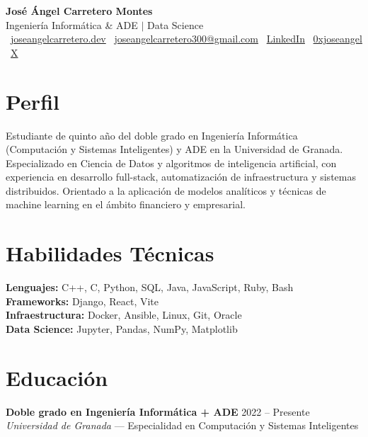 \documentclass[12pt,a4paper]{article}
\begin{document}
\begin{center}
  {\LARGE\bfseries José Ángel Carretero Montes}\\[6pt]
  {\normalsize Ingeniería Informática \& ADE $\mid$ Data Science}\\[8pt]
  \footnotesize
  \faGlobe\ \href{https://joseangelcarretero.dev}{joseangelcarretero.dev} \hspace{6pt}
  \faEnvelope\ \href{mailto:joseangelcarretero300@gmail.com}{joseangelcarretero300@gmail.com} \hspace{6pt}
  \faLinkedin\ \href{https://www.linkedin.com/in/jos\%C3\%A9-\%C3\%A1ngel-carretero-montes-476008202/}{LinkedIn} \hspace{6pt}
  \faGithub\ \href{https://github.com/0xjoseangel}{0xjoseangel} \hspace{6pt}
  \faTwitter\ \href{https://x.com/0xjoseangel}{X}
\end{center}

\section{Perfil}
Estudiante de quinto año del doble grado en Ingeniería Informática (Computación y Sistemas Inteligentes) y ADE en la Universidad de Granada. Especializado en Ciencia de Datos y algoritmos de inteligencia artificial, con experiencia en desarrollo full-stack, automatización de infraestructura y sistemas distribuidos. Orientado a la aplicación de modelos analíticos y técnicas de machine learning en el ámbito financiero y empresarial.

\section{Habilidades Técnicas}
\textbf{Lenguajes:} C++, C, Python, SQL, Java, JavaScript, Ruby, Bash \\
\textbf{Frameworks:} Django, React, Vite \\
\textbf{Infraestructura:} Docker, Ansible, Linux, Git, Oracle \\
\textbf{Data Science:} Jupyter, Pandas, NumPy, Matplotlib

\section{Educación}
\textbf{Doble grado en Ingeniería Informática + ADE} \hfill 2022 -- Presente \\
\textit{Universidad de Granada} --- Especialidad en Computación y Sistemas Inteligentes
\end{document}
